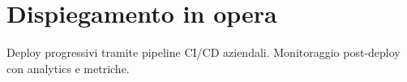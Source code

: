 \chapter{Dispiegamento in opera}
Deploy progressivi tramite pipeline CI/CD aziendali. Monitoraggio post-deploy con analytics e metriche.
